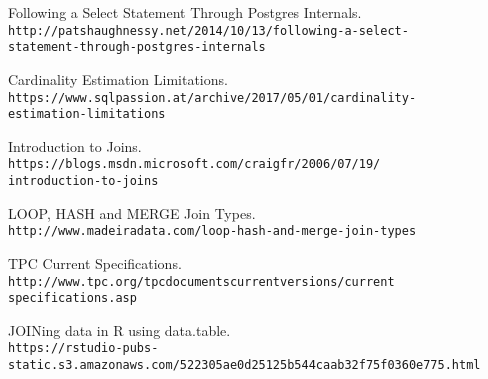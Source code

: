 \begin{thebibliography}{9}
Following a Select Statement Through Postgres Internals.
\\\texttt{http://patshaughnessy.net/2014/10/13/following-a-select-\\statement-through-postgres-internals}

Cardinality Estimation Limitations.
\\\texttt{https://www.sqlpassion.at/archive/2017/05/01/cardinality-\\estimation-limitations}

Introduction to Joins.
\\\texttt{https://blogs.msdn.microsoft.com/craigfr/2006/07/19/\\introduction-to-joins}

LOOP, HASH and MERGE Join Types.
\\\texttt{http://www.madeiradata.com/loop-hash-and-merge-join-types}

TPC Current Specifications.
\\\texttt{http://www.tpc.org/tpc\textunderscore documents\textunderscore current\textunderscore versions/current\textunderscore \\specifications.asp}

JOINing data in R using data.table.
\\\texttt{https://rstudio-pubs-static.s3.amazonaws.com/52230\textunderscore 5ae0d25125b544caab32f75f0360e775.html}

\end{thebibliography}
